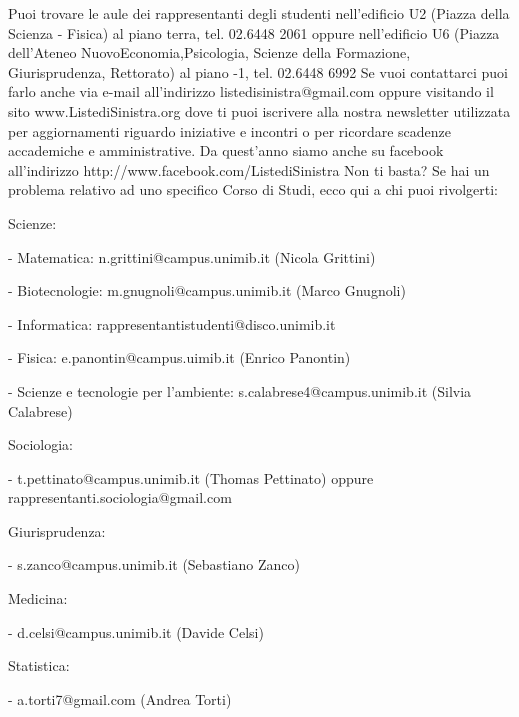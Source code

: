 Puoi trovare le aule dei rappresentanti degli studenti  nell'edificio U2 (Piazza della Scienza - Fisica) al piano terra, tel. 02.6448 2061 oppure nell'edificio U6 (Piazza dell'Ateneo NuovoEconomia,Psicologia, Scienze della Formazione, Giurisprudenza, Rettorato) al piano -1, tel. 02.6448 6992
Se vuoi contattarci puoi farlo anche via e-mail all’indirizzo listedisinistra@gmail.com oppure visitando il sito www.ListediSinistra.org dove ti puoi iscrivere alla nostra newsletter utilizzata per aggiornamenti riguardo iniziative e incontri o per ricordare scadenze accademiche e amministrative.
Da quest'anno siamo anche su facebook all'indirizzo http://www.facebook.com/ListediSinistra 
Non ti basta? Se hai un problema relativo ad uno specifico Corso di Studi, ecco qui a chi puoi rivolgerti:

Scienze:
   \item- Matematica: n.grittini@campus.unimib.it (Nicola Grittini)
   \item- Biotecnologie: m.gnugnoli@campus.unimib.it (Marco Gnugnoli)
   \item- Informatica: rappresentantistudenti@disco.unimib.it
   \item- Fisica: e.panontin@campus.uimib.it (Enrico Panontin)
   \item- Scienze e tecnologie per l'ambiente: s.calabrese4@campus.unimib.it (Silvia Calabrese)
   
Sociologia: 
   \item- t.pettinato@campus.unimib.it (Thomas Pettinato) oppure rappresentanti.sociologia@gmail.com

Giurisprudenza: 
   \item- s.zanco@campus.unimib.it (Sebastiano Zanco)
   
Medicina: 
   \item- d.celsi@campus.unimib.it (Davide Celsi)
   
Statistica: 
   \item- a.torti7@gmail.com (Andrea Torti)
